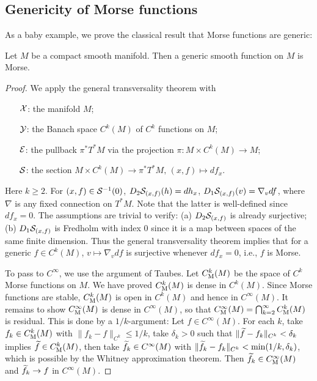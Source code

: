 \subsection{Genericity of Morse functions}
As a baby example, we prove the classical result 
that Morse functions are generic:

\begin{theorem}
	Let $M$ be a compact smooth manifold. 
	Then a generic smooth function on $M$ is Morse.
\end{theorem}

\begin{proof}
	We apply the general transversality theorem with
	\begin{itemize}
		\item[${\mathcal{X}}$:] 
			the manifold $M$;
		\item[${\mathcal{Y}}$:] 
			the Banach space $C^k (M)$ of $C^k$ functions on $M$;
		\item[${\mathcal{E}}$:] 
			the pullback $\pi^*T^*M$ via the projection 
			$\pi \colon M \times C^k (M) \to M$;
		\item[${\mathcal{S}}$:] 
			the section $M \times C^k (M) \to \pi^*T^*M,\, (x, f) \mapsto df_x$.
	\end{itemize}
	Here $k\geq2$. 
	For $(x, f) \in {\mathcal{S}}^{-1} (0)$, $D_2{\mathcal{S}}_{(x, f)} (h) = dh_x$, 
	$D_1{\mathcal{S}}_{(x, f)}(v) = \nabla_v df$, where $\nabla$ is any 
	fixed connection on $T^*M$. 
	Note that the latter is well-defined since $df_x=0$. 
	The assumptions are trivial to verify: 
	(a) $D_2{\mathcal{S}}_{(x, f)}$ is already surjective; 
	(b) $D_1{\mathcal{S}}_{(x, f)}$ is Fredholm with index $0$ since it is a map 
	between spaces of the same finite dimension. 
	Thus the general transversality theorem implies that 
	for a generic $f \in C^k (M)$, $v \mapsto \nabla_v df$ is surjective 
	whenever $df_x = 0$, i.e., $f$ is Morse.

	To pass to $C^\infty$, we use the argument of Taubes. 
	Let $C^k_{\mathrm{M}} (M)$ be the space of $C^k$ Morse functions on $M$. 
	We have proved $C^k_{\mathrm{M}} (M)$ is dense in $C^k (M)$. 
	Since Morse functions are stable, $C_{\mathrm{M}}^k (M)$ is open 
	in $C^k (M)$ and hence in $C^\infty (M)$. 
	It remains to show $C^\infty_{\mathrm{M}} (M)$ is dense in $C^\infty (M)$, 
	so that $C^\infty_{\mathrm{M}} (M) = \bigcap _{k=2} ^\infty C^k_{\mathrm{M}} (M)$ 
	is residual. 
	This is done by a $1 / k$-argument: 
	Let $f \in C^\infty (M)$. 
	For each $k$, take $f_k \in C^k_{\mathrm{M}} (M)$ with 
	$\| f_k - f \|_{C^k} \leq 1 / k$, take $\delta_k > 0$ such that 
	$\| \widetilde{f} - f_k \|_{C^k} < \delta_k$ implies $\widetilde{f} \in C^k_{\mathrm{M}} (M)$, 
	then take $\widetilde{f}_k \in C^\infty (M)$ with 
	$\| \widetilde{f}_k - f_k \|_{C^k} < \min (1 / k, \delta_k)$, 
	which is possible by the Whitney approximation theorem. 
	Then $\widetilde{f}_k \in C^\infty_{\mathrm{M}} (M)$ and 
	$\widetilde{f}_k \to f$ in $C^\infty (M)$.
\end{proof}

